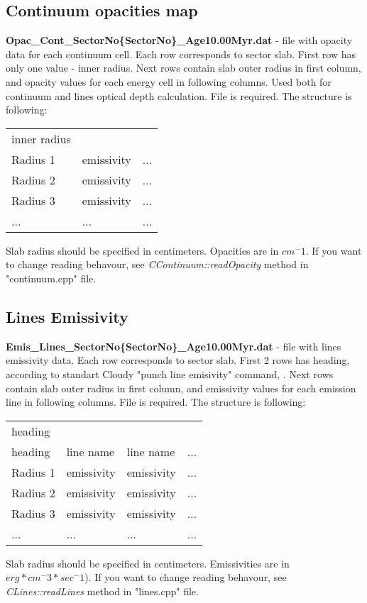 \documentclass[a4paper]{article}
\begin{document}
\subsection{Continuum opacities map}
{\bf Opac\_Cont\_SectorNo\{SectorNo\}\_Age10.00Myr.dat} - file with opacity data for each continuum cell. Each row
corresponds to sector slab. First row has only one value - inner radius. Next rows contain slab outer radius in first column, 
and opacity values for each energy cell in following columns. Used both for continuum and lines optical depth calculation. 
File is required.
The structure is following:
\begin{table}[H]
    \begin{tabular}{lll}
        inner radius & & \\
        Radius 1 & emissivity & ... \\
        Radius 2 & emissivity & ... \\
        Radius 3 & emissivity & ... \\
        ... & ... & ... \\
    \end{tabular}
\end{table}
Slab radius should be specified in centimeters. Opacities are in $cm^-1$.
If you want to change reading behavour, see {\it CContinuum::readOpacity} method in "continuum.cpp" file.

\subsection{Lines Emissivity}
{\bf Emis\_Lines\_SectorNo\{SectorNo\}\_Age10.00Myr.dat} - file with lines emissivity data. Each row
corresponds to sector slab. First 2 rows has heading, according to standart Cloudy 
"punch line emisivity" command, \cite{Cloudy}. Next rows contain slab outer radius in first column, 
and emissivity values for each emission line in following columns. File is required.
The structure is following:
\begin{table}[H]
    \begin{tabular}{llll}
        heading & & & \\
        heading & line name & line name & ...\\
        Radius 1 & emissivity & emissivity & ... \\
        Radius 2 & emissivity & emissivity & ... \\
        Radius 3 & emissivity & emissivity & ... \\
        ... & ... & ... & ... \\
    \end{tabular}
\end{table}
Slab radius should be specified in centimeters. Emissivities are in $erg * cm^-3 * sec^-1$).
If you want to change reading behavour, see {\it CLines::readLines} method in "lines.cpp" file.
\end{document}
